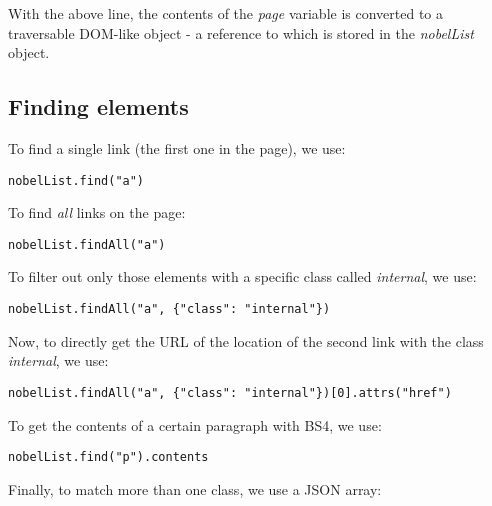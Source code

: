 \noindent
With the above line, the contents of the \textit{page} variable is converted to a traversable DOM-like object - a reference to which is stored in the \textit{nobelList} object. 

\subsection{Finding elements}
To find a single link (the first one in the page), we use:

\vspace{-15pt}
\begin{verbatim}
nobelList.find("a")
\end{verbatim}
\vspace{-10pt}	

\noindent
To find \textit{all} links on the page:

\vspace{-15pt}
\begin{verbatim}
nobelList.findAll("a")
\end{verbatim}
\vspace{-10pt}	

\noindent
To filter out only those elements with a specific class called \textit{internal}, we use:

\vspace{-15pt}
\begin{verbatim}
nobelList.findAll("a", {"class": "internal"})
\end{verbatim}
\vspace{-10pt}	

\noindent
Now, to directly get the URL of the location of the second link with the class \textit{internal}, we use:

\vspace{-15pt}
\begin{verbatim}
nobelList.findAll("a", {"class": "internal"})[0].attrs("href")
\end{verbatim}
\vspace{-10pt}	

\noindent
To get the contents of a certain paragraph with BS4, we use:

\vspace{-15pt}
\begin{verbatim}
nobelList.find("p").contents
\end{verbatim}
\vspace{-10pt}	

\noindent
Finally, to match more than one class, we use a JSON array:

